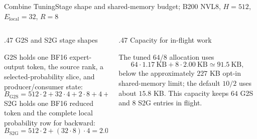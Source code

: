 \documentclass[aspectratio=169,10pt]{beamer}
\renewcommand{\NvidiaSource}[1]{}
\newcommand{\LocalSource}[1]{\NvidiaSource{\texttt{#1}}}
\begin{document}
\begin{frame}[fragile]{Combine Tuning}{Stage shape and shared-memory budget; B200 NVL8, $H=512$, $E_{\mathrm{local}}=32$, $R=8$}
  \LocalSource{notes/hybrid-ep-sparse-opt-new.md}
  \begin{columns}[T,onlytextwidth]
    \begin{column}{.47\textwidth}
      {\NvidiaSansMedium G2S and S2G stage shapes}\NvidiaTightRule{.6pt}\vspace{.04in}
      {\fontsize{8.0}{9.2}\selectfont\setlength{\abovedisplayskip}{.025in}\setlength{\belowdisplayskip}{.025in}
      G2S holds one BF16 expert-output token, the source rank, a selected-probability slice, and
      producer/consumer state:
      \[
        B_{\mathrm{G2S}} = 512\cdot2 + 32\cdot4 + 2\cdot8 + 4 + 1
        \simeq 1.17\ \mathrm{KB}.
      \]
      S2G holds one BF16 reduced token and the complete local probability row for backward:
      \[
        B_{\mathrm{S2G}} = 512\cdot2 + (32\cdot8)\cdot4 = 2.00\ \mathrm{KB}.
      \]\par}
    \end{column}
    \begin{column}{.47\textwidth}
      {\NvidiaSansMedium Capacity for in-flight work}\NvidiaTightRule{.6pt}\vspace{.04in}
      {\fontsize{8.0}{9.2}\selectfont\setlength{\abovedisplayskip}{.025in}\setlength{\belowdisplayskip}{.025in}
      The tuned $64/8$ allocation uses
      \[
        64\cdot1.17\ \mathrm{KB} + 8\cdot2.00\ \mathrm{KB}
        \simeq 91.5\ \mathrm{KB},
      \]
      below the approximately $227$ KB opt-in shared-memory limit; the default $10/2$ uses about
      $15.8$ KB. This capacity keeps $64$ G2S and $8$ S2G entries in flight.\par}
    \end{column}
  \end{columns}
\end{frame}
\end{document}
